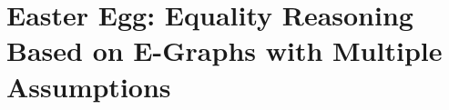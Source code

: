 \chapter{Easter Egg: Equality Reasoning Based on E-Graphs with Multiple Assumptions}
\label{chap:colors}







